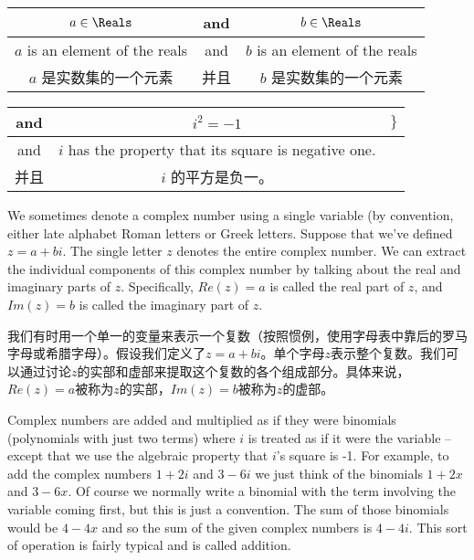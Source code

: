 \begin{tabular}{c|c|c}
\rule[-10pt]{0pt}{22pt} $a \in \Reals$ & and & $b \in \Reals$ \\ \hline
\rule[-6pt]{0pt}{22pt} $a$ is an element of the reals & and & $b$ is an
element of the reals \\
\rule[-6pt]{0pt}{22pt} $a$ 是实数集的一个元素 & 并且 & $b$ 是实数集的一个元素 \\
\end{tabular}

\vspace{.2in}

\begin{tabular}{c|c|c}
\rule[-10pt]{0pt}{22pt} and & $i^2 = -1$ & $\}$ \\ \hline
\rule[-6pt]{0pt}{22pt} and & $i$ has the property that its
square is negative one. &  \\
\rule[-6pt]{0pt}{22pt} 并且 & $i$ 的平方是负一。 & \\
\end{tabular}

\vspace{.2in}

We sometimes denote a complex number using a single variable (by
convention, either late alphabet Roman letters or Greek letters.
Suppose that we've defined $z = a + bi$.  The single letter $z$
denotes the entire complex number.  We can extract the individual
components of this complex number by talking about the 
real and
imaginary parts of $z$.  
Specifically, $Re(z) = a$ is called the
real part of $z$, and $Im(z) = b$ is called the imaginary part of
$z$.

我们有时用一个单一的变量来表示一个复数（按照惯例，使用字母表中靠后的罗马字母或希腊字母）。假设我们定义了$z = a + bi$。单个字母$z$表示整个复数。我们可以通过讨论$z$的实部和虚部来提取这个复数的各个组成部分。具体来说，$Re(z) = a$被称为$z$的实部，$Im(z) = b$被称为$z$的虚部。


Complex numbers are added and multiplied as if they were binomials
(polynomials with just two terms) where $i$ is treated as if it were 
the variable -- except that we use the algebraic property that $i$'s
square is -1.  For example, to add the complex numbers $1+2i$ and
$3-6i$ we just think of the binomials $1+2x$ and $3-6x$.  Of course we
normally write a binomial with the term involving the variable coming
first, but this is just a convention.  The sum of those binomials
would be $4-4x$ and so the sum of the given complex numbers is $4-4i$.
This sort of operation is fairly typical and is called 
 addition.

